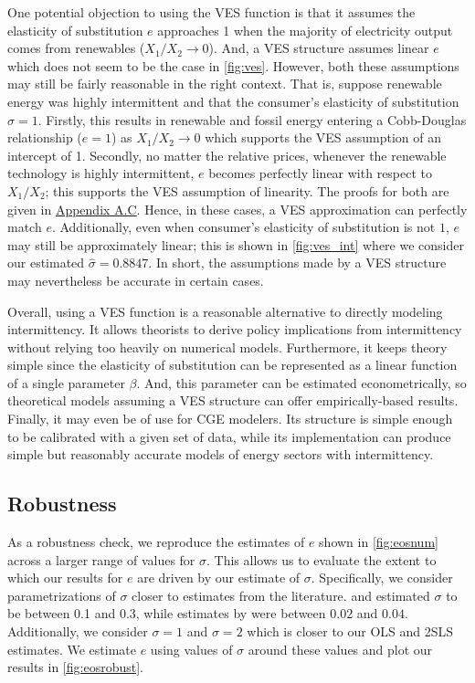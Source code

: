 \documentclass[11pt,a4paper,leqno]{extarticle}
\begin{document}
	
	One potential objection to using the VES function is that it assumes the elasticity of substitution $e$ approaches 1 when the majority of electricity output comes from renewables ($X_1/X_2 \to 0$). And, a VES structure assumes linear $e$ which does not seem to be the case in \autoref{fig:ves}. However, both these assumptions may still be fairly reasonable in the right context. That is, suppose renewable energy was highly intermittent and that the consumer's elasticity of substitution $\sigma = 1$. Firstly, this results in renewable  and fossil energy entering a Cobb-Douglas relationship ($e = 1$) as $X_1/X_2 \to 0$ which supports the VES assumption of an intercept of 1. Secondly, no matter the relative prices, whenever the renewable technology is highly intermittent, $e$ becomes perfectly linear with respect to $X_1/X_2$; this supports the VES assumption of linearity. The proofs for both are given in \hyperref[sec:asympeos]{Appendix A.C}. Hence, in these cases, a VES approximation  can perfectly match $e$. Additionally, even when consumer's elasticity of substitution is not $1$, $e$ may still be approximately linear; this is shown in \autoref{fig:ves_int} where we consider our estimated $\hat{\sigma} = 0.8847$. In short, the assumptions made by a VES structure may nevertheless be accurate in certain cases. 
	
	
	
	Overall, using a VES function is a reasonable alternative to directly modeling intermittency. It allows theorists to derive policy implications from intermittency without relying too heavily on numerical models. Furthermore, it keeps theory simple since the elasticity of substitution can be represented as a linear function of a single parameter $\beta$. And, this parameter can be estimated econometrically, so theoretical models assuming a VES structure can offer empirically-based results. Finally, it may even be of use for CGE modelers. Its structure is simple enough to be calibrated with a given set of data, while its implementation can produce simple but reasonably accurate models of energy sectors with intermittency. 
	
	\subsection{Robustness}
	
	As a robustness check, we reproduce the estimates of $e$ shown in \autoref{fig:eosnum} across a larger range of values for $\sigma$. This allows us to  evaluate the extent to which our results for $e$ are driven by our estimate of $\sigma$. Specifically, we consider parametrizations of $\sigma$ closer to estimates from the literature. \citet{Herriges} and \citet{KS1994} estimated $\sigma$ to be between 0.1 and 0.3, while estimates by \citet{Schwarz} were between $0.02$ and $0.04$. Additionally, we consider $\sigma = 1$ and $\sigma = 2$ which is closer to our OLS and 2SLS estimates.  We estimate $e$ using values of $\sigma$ around these values and plot our results in  \autoref{fig:eosrobust}. 
	
\end{document}
